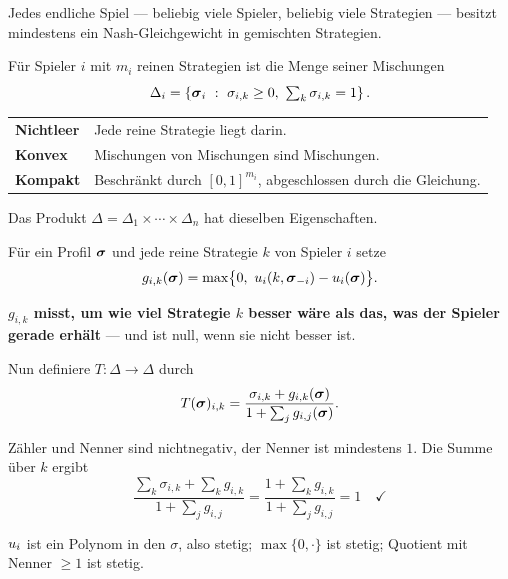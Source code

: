 \begin{merksatz}
Jedes endliche Spiel --- beliebig viele Spieler, beliebig viele Strategien --- besitzt mindestens ein Nash-Gleichgewicht in gemischten Strategien.

Für Spieler $i$ mit $m_i$ reinen Strategien ist die Menge seiner Mischungen
\[ \Delta_i = \left\{ \vek\sigma_i \ : \ \sigma_{i,k} \ge 0, \ \textstyle\sum_k \sigma_{i,k} = 1 \right\} . \]

\begin{center}
{\small
\renewcommand{\arraystretch}{1.5}
\begin{tabular}{@{}P{2.4cm}P{6.2cm}@{}}
\toprule
\textbf{Nichtleer} & Jede reine Strategie liegt darin.\\
\textbf{Konvex} & Mischungen von Mischungen sind Mischungen.\\
\textbf{Kompakt} & Beschränkt durch $[0,1]^{m_i}$, abgeschlossen durch die Gleichung.\\
\bottomrule
\end{tabular}}
\end{center}

Das Produkt $\Delta = \Delta_1\times\cdots\times\Delta_n$ hat dieselben Eigenschaften.

Für ein Profil $\boldsymbol{\sigma}$ und jede reine Strategie $k$ von Spieler $i$ setze
\[ g_{i,k}(\vek\sigma) = \max\bigl\{0,\ \Aus_i(k,\vek\sigma_{-i}) - \Aus_i(\vek\sigma)\bigr\} . \]

\begin{center}
\begin{minipage}{0.9\textwidth}
\textbf{$g_{i,k}$ misst, um wie viel Strategie $k$ besser wäre als das, was der Spieler gerade erhält} --- und ist null, wenn sie nicht besser ist.
\end{minipage}
\end{center}

Nun definiere $T: \Delta \to \Delta$ durch
\[ T(\boldsymbol{\sigma})_{i,k} = \frac{\sigma_{i,k} + g_{i,k}(\boldsymbol{\sigma})}{1 + \sum_{j} g_{i,j}(\boldsymbol{\sigma})} . \]

 Zähler und Nenner sind nichtnegativ, der Nenner ist mindestens $1$. Die Summe über $k$ ergibt
\[ \frac{\sum_k \sigma_{i,k} + \sum_k g_{i,k}}{1+\sum_j g_{i,j}} = \frac{1 + \sum_k g_{i,k}}{1+\sum_j g_{i,j}} = 1 \quad \checkmark \]

 $u_i$ ist ein Polynom in den $\sigma$, also stetig; $\max\{0,\cdot\}$ ist stetig; Quotient mit Nenner $\ge 1$ ist stetig.


\end{merksatz}
